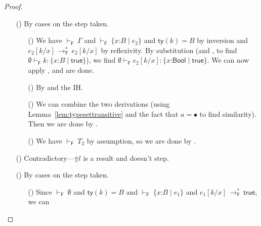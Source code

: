 \documentclass[9pt]{extarticle}
\newcommand{\ottnt}[1]{\mathit{#1}}
\newcommand{\ottsym}[1]{#1}
\begin{document}
{\begin{lemma}
\begin{proof}
{\begin{itemize}
\begin{itemize}
      \item[(\E{AppRaiseR})] By regularity, $ \mathord{  \vdash _{  \mathsf{F}  } }~ \ottnt{T_{{\mathrm{2}}}} $, so we are done by .
      \end{itemize}
    \item[(\T{Cast})] By cases on the step taken.
      \begin{itemize}
      \item[(\E{CheckNone})] We have $ \mathord{  \vdash _{  \mathsf{F}  } }~ \Gamma $ and $ \mathord{  \vdash _{  \mathsf{F}  } }~  \{ \mathit{x} \mathord{:} \ottnt{B} \mathrel{\mid} \ottnt{e_{{\mathrm{2}}}} \}  $ and
        $ \mathsf{ty} ( \ottnt{k} )   \ottsym{=}  \ottnt{B}$ by inversion and $ \ottnt{e_{{\mathrm{2}}}}  [  \ottnt{k} / \mathit{x}  ]  \,  \longrightarrow ^{*}_{  \mathsf{F}  }  \,  \ottnt{e_{{\mathrm{2}}}}  [  \ottnt{k} / \mathit{x}  ] $ by
        reflexivity. By substitution (and , to find $ \emptyset   \vdash _{  \mathsf{F}  }  \ottnt{k}  :   \{ \mathit{x} \mathord{:} \ottnt{B} \mathrel{\mid}  \mathsf{true}  \}  $), we find $ \emptyset   \vdash _{  \mathsf{F}  }   \ottnt{e_{{\mathrm{2}}}}  [  \ottnt{k} / \mathit{x}  ]   :   \{ \mathit{x} \mathord{:}  \mathsf{Bool}  \mathrel{\mid}  \mathsf{true}  \}  $. We can now apply , and are done.
      \item[(\E{CastInner})] By  and the IH.
      \item[(\E{CastMerge})] We can combine the
        two  derivations (using
        Lemma~\ref{lem:typesettransitive} and the fact that
        $\ottnt{a}  \ottsym{=}  \bullet$ to find similarity). Then we are done by .
      \item[(\E{CastRaise})] We have $ \mathord{  \vdash _{  \mathsf{F}  } }~ \ottnt{T_{{\mathrm{2}}}} $ by assumption, so we
        are done by .
      \end{itemize}
    \item[(\T{Blame})] Contradictory---$ \mathord{\Uparrow}  \ottnt{l} $ is a result and
      doesn't step.
    \item[(\T{Check})]  By cases on the step taken.
\begin{itemize}
      \item[(\E{CheckOK})] Since $ \mathord{  \vdash _{  \mathsf{F}  } }~ \emptyset $ and $ \mathsf{ty} ( \ottnt{k} )   \ottsym{=}  \ottnt{B}$
        and $ \mathord{  \vdash _{  \mathsf{F}  } }~  \{ \mathit{x} \mathord{:} \ottnt{B} \mathrel{\mid} \ottnt{e_{{\mathrm{1}}}} \}  $ and $ \ottnt{e_{{\mathrm{1}}}}  [  \ottnt{k} / \mathit{x}  ]  \,  \longrightarrow ^{*}_{  \mathsf{F}  }  \,  \mathsf{true} $, we can

\end{itemize}
\end{itemize}}
\end{proof}
\end{lemma}}
\end{document}
